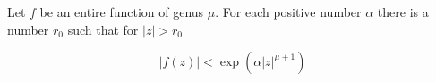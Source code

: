 Let $f$ be an entire function of genus $\mu$. For each positive number $\alpha$ there is a number $r_0$ such that for $|z| > r_0$

$$|f(z)| < \exp(\alpha |z|^{\mu+1})$$
